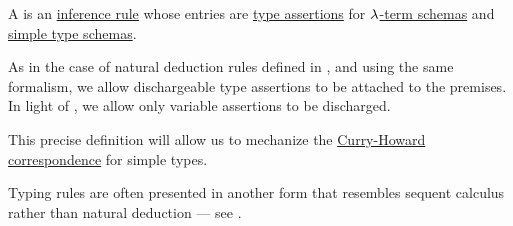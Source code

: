 \begin{definition}\label{def:simple_typing_rule}\mimprovised
  A  is an \hyperref[def:inference_rule]{inference rule} whose entries are \hyperref[def:type_assertion]{type assertions} for \hyperref[def:lambda_term_schema]{\( \mathrm{\lambda} \)-term schemas} and \hyperref[def:simple_type_schema]{simple type schemas}.

  As in the case of natural deduction rules defined in , and using the same formalism, we allow dischargeable type assertions to be attached to the premises. In light of , we allow only variable assertions to be discharged.
\end{definition}
\begin{comments}
  \item This precise definition will allow us to mechanize the \hyperref[con:curry_howard_correspondence]{Curry-Howard correspondence} for simple types.

  \item Typing rules are often presented in another form that resembles sequent calculus rather than natural deduction --- see .
\end{comments}

